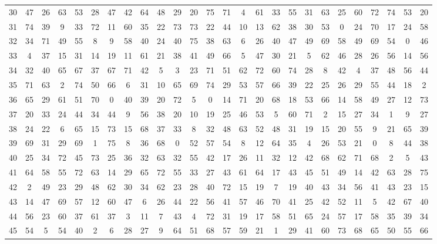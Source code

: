 \begin{table}
\begin{tabular}{c c c c c c c c c c c c c c c c c c c c c c c c c c }
30 & 47 & 26 & 63 & 53 & 28 & 47 & 42 & 64 & 48 & 29 & 20 & 75 & 71 & 4 & 61 & 33 & 55 & 31 & 63 & 25 & 60 & 72 & 74 & 53 & 20 \\
31 & 74 & 39 & 9 & 33 & 72 & 11 & 60 & 35 & 22 & 73 & 73 & 22 & 44 & 10 & 13 & 62 & 38 & 30 & 53 & 0 & 24 & 70 & 17 & 24 & 58 \\
32 & 34 & 71 & 49 & 55 & 8 & 9 & 58 & 40 & 24 & 40 & 75 & 38 & 63 & 6 & 26 & 40 & 47 & 49 & 69 & 58 & 49 & 69 & 54 & 0 & 46 \\
33 & 4 & 37 & 15 & 31 & 14 & 19 & 11 & 61 & 21 & 38 & 41 & 49 & 66 & 5 & 47 & 30 & 21 & 5 & 62 & 46 & 28 & 26 & 56 & 14 & 56 \\
34 & 32 & 40 & 65 & 67 & 37 & 67 & 71 & 42 & 5 & 3 & 23 & 71 & 51 & 62 & 72 & 60 & 74 & 28 & 8 & 42 & 4 & 37 & 48 & 56 & 44 \\
35 & 71 & 63 & 2 & 74 & 50 & 66 & 6 & 31 & 10 & 65 & 69 & 74 & 29 & 53 & 57 & 66 & 39 & 22 & 25 & 26 & 29 & 55 & 44 & 18 & 2 \\
36 & 65 & 29 & 61 & 51 & 70 & 0 & 40 & 39 & 20 & 72 & 5 & 0 & 14 & 71 & 20 & 68 & 18 & 53 & 66 & 14 & 58 & 49 & 27 & 12 & 73 \\
37 & 20 & 33 & 24 & 44 & 34 & 44 & 9 & 56 & 38 & 20 & 10 & 19 & 25 & 46 & 53 & 5 & 60 & 71 & 2 & 15 & 27 & 34 & 1 & 9 & 27 \\
38 & 24 & 22 & 6 & 65 & 15 & 73 & 15 & 68 & 37 & 33 & 8 & 32 & 48 & 63 & 52 & 48 & 31 & 19 & 15 & 20 & 55 & 9 & 21 & 65 & 39 \\
39 & 69 & 31 & 29 & 69 & 1 & 75 & 8 & 36 & 68 & 0 & 52 & 57 & 54 & 8 & 12 & 64 & 35 & 4 & 26 & 53 & 21 & 0 & 8 & 44 & 38 \\
40 & 25 & 34 & 72 & 45 & 73 & 25 & 36 & 32 & 63 & 32 & 55 & 42 & 17 & 26 & 11 & 32 & 12 & 42 & 68 & 62 & 71 & 68 & 2 & 5 & 43 \\
41 & 64 & 58 & 55 & 72 & 63 & 14 & 29 & 65 & 72 & 55 & 33 & 27 & 43 & 61 & 64 & 17 & 43 & 45 & 51 & 49 & 14 & 42 & 63 & 28 & 75 \\
42 & 2 & 49 & 23 & 29 & 48 & 62 & 30 & 34 & 62 & 23 & 28 & 40 & 72 & 15 & 19 & 7 & 19 & 40 & 43 & 34 & 56 & 41 & 43 & 23 & 15 \\
43 & 14 & 47 & 69 & 57 & 12 & 60 & 47 & 6 & 26 & 44 & 22 & 56 & 41 & 57 & 46 & 70 & 41 & 25 & 42 & 52 & 11 & 5 & 42 & 67 & 40 \\
44 & 56 & 23 & 60 & 37 & 61 & 37 & 3 & 11 & 7 & 43 & 4 & 72 & 31 & 19 & 17 & 58 & 51 & 65 & 24 & 57 & 17 & 58 & 35 & 39 & 34 \\
45 & 54 & 5 & 54 & 40 & 2 & 6 & 28 & 27 & 9 & 64 & 51 & 68 & 57 & 59 & 21 & 1 & 29 & 41 & 60 & 73 & 68 & 65 & 50 & 55 & 66 \\

\end{tabular}
\end{table}
